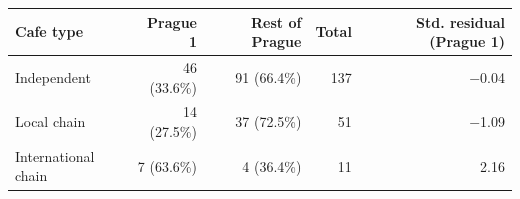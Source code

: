 \begin{tabular}{lrrrr}
  \toprule
Cafe type & Prague 1 & Rest of Prague & Total & Std. residual (Prague 1) \\ 
  \midrule
Independent & 46 (33.6\%) & 91 (66.4\%) & 137 & $-$0.04 \\ 
  Local chain & 14 (27.5\%) & 37 (72.5\%) & 51 & $-$1.09 \\ 
  International chain & 7 (63.6\%) & 4 (36.4\%) & 11 & 2.16 \\ 
   \bottomrule
\end{tabular}
